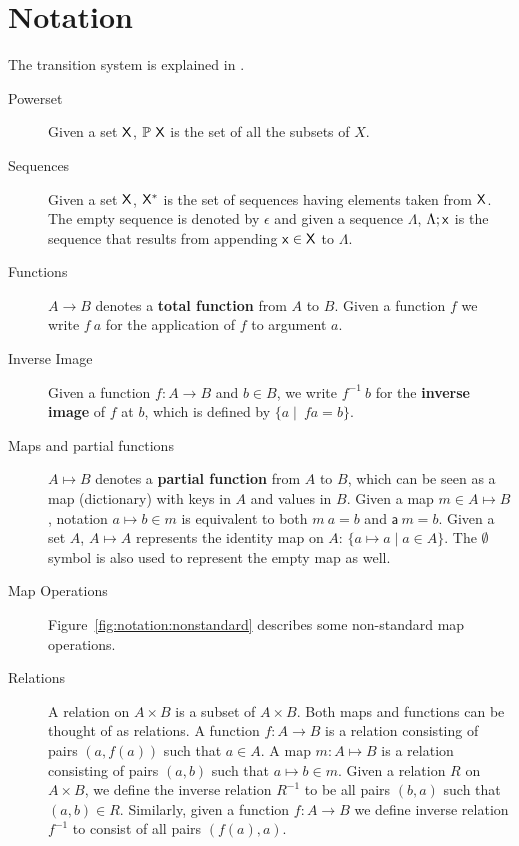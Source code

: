 \section{Notation}
\label{sec:notation-shelley}

The transition system is explained in \cite{small_step_semantics}.

\begin{description}
  \item[Powerset] Given a set $\mathsf{X}$, $\mathbb{P}~\mathsf{X}$ is the set of all
    the subsets of $X$.
  \item[Sequences] Given a set $\mathsf{X}$, $\mathsf{X}^{*}$ is the set of
    sequences having elements taken from $\mathsf{X}$. The empty sequence is
    denoted by $\epsilon$ and given a sequence $\Lambda$, $\Lambda; \mathsf{x}$ is
    the sequence that results from appending $\mathsf{x} \in \mathsf{X}$ to
    $\Lambda$.
  \item[Functions] $A \to B$ denotes a \textbf{total function} from $A$ to $B$.
    Given a function $f$ we write $f~a$ for the application of $f$ to argument
    $a$.
  \item[Inverse Image] Given a function $f: A \to B$ and $b\in B$, we write
    $f^{-1}~b$ for the \textbf{inverse image} of $f$ at $b$, which is defined by
    $\{a \mid\ f a =  b\}$.
  \item[Maps and partial functions] $A \mapsto B$ denotes a \textbf{partial
    function} from $A$ to $B$, which can be seen as a map (dictionary) with
    keys in $A$ and values in $B$. Given a map $m \in A \mapsto B$, notation
    $a \mapsto b \in m$ is equivalent to both $m~ a = b$ and $\mathsf{a}~m = b$.
    Given a set $A$, $A \mapsto A$ represents the identity map on $A$:
    $\{a \mapsto a \mid a \in A\}$. The $\emptyset$ symbol is also used to
    represent the empty map as well.
  \item[Map Operations] Figure~\ref{fig:notation:nonstandard}
    describes some non-standard map operations.
  \item[Relations] A relation on $A\times B$ is a subset of $A\times B$.
    Both maps and functions can be thought of as relations.
    A function $f:A\to B$ is a relation consisting of pairs $(a, f(a))$ such that $a\in A$.
    A map $m: A\mapsto B$ is a relation consisting of pairs $(a, b)$ such that
    $a\mapsto b \in m$.
    Given a relation $R$ on $A\times B$, we define the inverse relation $R^{-1}$ to be
    all pairs $(b, a)$ such that $(a, b)\in R$. Similarly, given a function $f:A\to B$ we
    define inverse relation $f^{-1}$ to consist of all pairs $(f(a), a)$.

\end{description}
